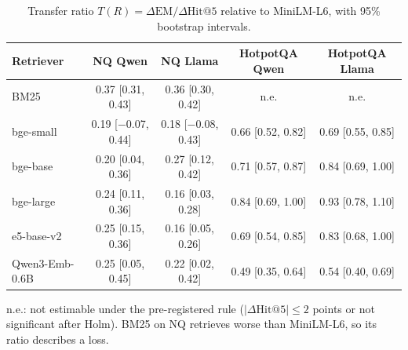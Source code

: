 \begin{table}[t]
\centering
\small
\caption{Transfer ratio $T(R)=\Delta\mathrm{EM}/\Delta\mathrm{Hit@5}$ relative to MiniLM-L6, with 95\% bootstrap intervals.}
\label{tab:transfer}
\begin{tabular}{lcccc}
\toprule
Retriever & NQ Qwen & NQ Llama & HotpotQA Qwen & HotpotQA Llama \\
\midrule
BM25 & 0.37 [0.31, 0.43] & 0.36 [0.30, 0.42] & n.e. & n.e. \\
bge-small & 0.19 [$-$0.07, 0.44] & 0.18 [$-$0.08, 0.43] & 0.66 [0.52, 0.82] & 0.69 [0.55, 0.85] \\
bge-base & 0.20 [0.04, 0.36] & 0.27 [0.12, 0.42] & 0.71 [0.57, 0.87] & 0.84 [0.69, 1.00] \\
bge-large & 0.24 [0.11, 0.36] & 0.16 [0.03, 0.28] & 0.84 [0.69, 1.00] & 0.93 [0.78, 1.10] \\
e5-base-v2 & 0.25 [0.15, 0.36] & 0.16 [0.05, 0.26] & 0.69 [0.54, 0.85] & 0.83 [0.68, 1.00] \\
Qwen3-Emb-0.6B & 0.25 [0.05, 0.45] & 0.22 [0.02, 0.42] & 0.49 [0.35, 0.64] & 0.54 [0.40, 0.69] \\
\bottomrule
\end{tabular}
\par\smallskip\parbox{\linewidth}{\footnotesize n.e.: not estimable under the pre-registered rule ($|\Delta\mathrm{Hit@5}|\le 2$ points or not significant after Holm). BM25 on NQ retrieves worse than MiniLM-L6, so its ratio describes a loss.}
\end{table}
